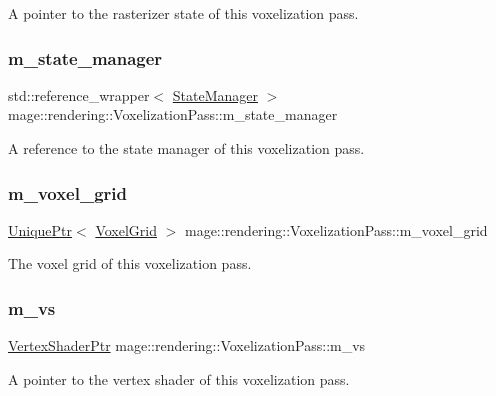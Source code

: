 A pointer to the rasterizer state of this voxelization pass. \hypertarget{classmage_1_1rendering_1_1_voxelization_pass_a449470bf0e0a246a2457b87289155330}{}\label{classmage_1_1rendering_1_1_voxelization_pass_a449470bf0e0a246a2457b87289155330} 
\subsubsection{\texorpdfstring{m\+\_\+state\+\_\+manager}{m\_state\_manager}}
{\footnotesize\ttfamily std\+::reference\+\_\+wrapper$<$ \hyperlink{classmage_1_1rendering_1_1_state_manager}{State\+Manager} $>$ mage\+::rendering\+::\+Voxelization\+Pass\+::m\+\_\+state\+\_\+manager\hspace{0.3cm}{\ttfamily [private]}}

A reference to the state manager of this voxelization pass. \hypertarget{classmage_1_1rendering_1_1_voxelization_pass_a5263939327363598c9d628db79b3cc49}{}\label{classmage_1_1rendering_1_1_voxelization_pass_a5263939327363598c9d628db79b3cc49} 
\subsubsection{\texorpdfstring{m\+\_\+voxel\+\_\+grid}{m\_voxel\_grid}}
{\footnotesize\ttfamily \hyperlink{namespacemage_a3316d7143a973e37adf1110f2e80ca31}{Unique\+Ptr}$<$ \hyperlink{classmage_1_1rendering_1_1_voxel_grid}{Voxel\+Grid} $>$ mage\+::rendering\+::\+Voxelization\+Pass\+::m\+\_\+voxel\+\_\+grid\hspace{0.3cm}{\ttfamily [private]}}

The voxel grid of this voxelization pass. \hypertarget{classmage_1_1rendering_1_1_voxelization_pass_aa95ee5cba6cfdf82d115f080421aee1c}{}\label{classmage_1_1rendering_1_1_voxelization_pass_aa95ee5cba6cfdf82d115f080421aee1c} 
\subsubsection{\texorpdfstring{m\+\_\+vs}{m\_vs}}
{\footnotesize\ttfamily \hyperlink{namespacemage_1_1rendering_aaf704b9c54a4181f4950a1761de69dda}{Vertex\+Shader\+Ptr} mage\+::rendering\+::\+Voxelization\+Pass\+::m\+\_\+vs\hspace{0.3cm}{\ttfamily [private]}}

A pointer to the vertex shader of this voxelization pass. 